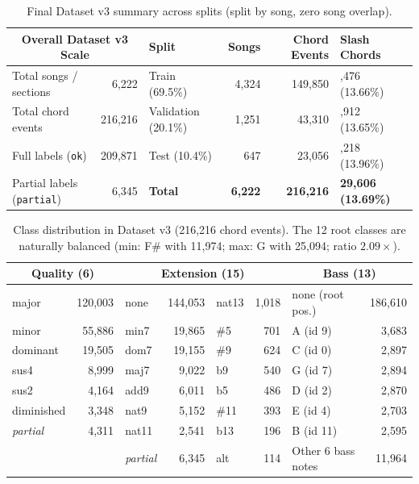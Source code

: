 \documentclass[a4paper]{article}
\begin{document}
\begin{table}[H]
    \centering
    \small
    \begin{tabularx}{\linewidth}{@{}lr@{\quad}lrr>{\raggedleft\arraybackslash}X@{}}
        \toprule
        \multicolumn{2}{c}{\textbf{Overall Dataset v3 Scale}} & \textbf{Split} & \textbf{Songs} & \textbf{Chord Events} & \textbf{Slash Chords} \\
        \midrule
        Total songs / sections & 6,222   & Train (69.5\%)      & 4,324 & 149,850 & 20,476 (13.66\%) \\
        Total chord events     & 216,216 & Validation (20.1\%) & 1,251 &  43,310 &  5,912 (13.65\%) \\
        Full labels (\texttt{ok}) & 209,871 & Test (10.4\%)    &   647 &  23,056 &  3,218 (13.96\%) \\
        Partial labels (\texttt{partial}) & 6,345 & \textbf{Total} & \textbf{6,222} & \textbf{216,216} & \textbf{29,606 (13.69\%)} \\
        \bottomrule
    \end{tabularx}
    \caption{Final Dataset v3 summary across splits (split by song, zero song overlap).}
    \label{tab:dataset_status}
\end{table}

\begin{table}[H]
    \centering
    \small
    \begin{tabular}{@{}lr@{\quad}lr@{\quad}lr@{\quad}lr@{}}
        \toprule
        \multicolumn{2}{c}{\textbf{Quality (6)}} & \multicolumn{4}{c}{\textbf{Extension (15)}} & \multicolumn{2}{c}{\textbf{Bass (13)}} \\
        \midrule
        major      & 120,003 & none  & 144,053 & nat13 & 1,018 & none (root pos.) & 186,610 \\
        minor      &  55,886 & min7  &  19,865 & \#5   &   701 & A  (id 9)        &   3,683 \\
        dominant   &  19,505 & dom7  &  19,155 & \#9   &   624 & C  (id 0)        &   2,897 \\
        sus4       &   8,999 & maj7  &   9,022 & b9    &   540 & G  (id 7)        &   2,894 \\
        sus2       &   4,164 & add9  &   6,011 & b5    &   486 & D  (id 2)        &   2,870 \\
        diminished &   3,348 & nat9  &   5,152 & \#11  &   393 & E  (id 4)        &   2,703 \\
        \textit{partial} & 4,311 & nat11 & 2,541 & b13 &   196 & B  (id 11)       &   2,595 \\
                   &         & \textit{partial} & 6,345 & alt & 114 & Other 6 bass notes & 11,964 \\
        \bottomrule
    \end{tabular}
    \caption{Class distribution in Dataset v3 (216,216 chord events). The 12 root classes are naturally balanced (min: F\# with 11,974; max: G with 25,094; ratio $2.09\times$).}
    \label{tab:class_distribution}
\end{table}
\end{document}
